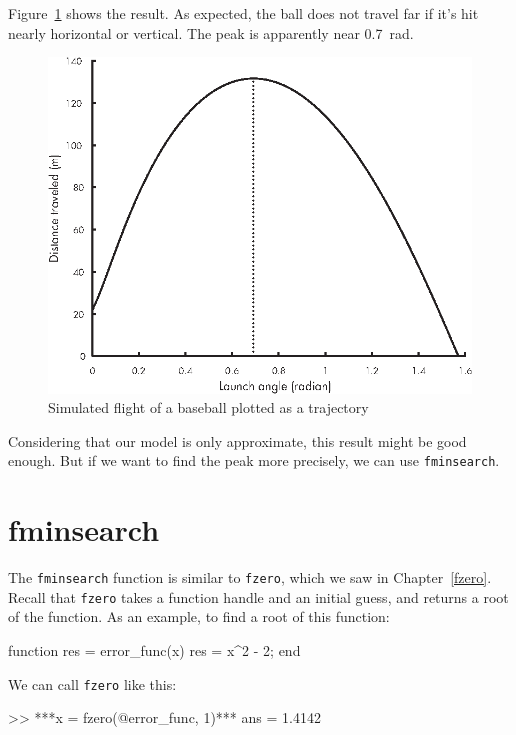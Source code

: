 Figure~\ref{fig:baseball4} shows the result.  As expected, the ball does not travel far if it's hit nearly horizontal or vertical. 
The peak is apparently near \SI{0.7}{\radian}.

\begin{figure}[H]
\includegraphics{book/images/figure13_02_new.eps}
\caption{Simulated flight of a baseball plotted as a trajectory}
\label{fig:baseball4}
\end{figure}


Considering that our model is only approximate, this result might be good enough.  But if we want to find the peak more precisely, we can use \lstinline{fminsearch}.


\section{fminsearch}

The \lstinline{fminsearch} function is similar to \lstinline{fzero}, which we saw in Chapter~\ref{fzero}.  Recall that \lstinline{fzero} takes a function handle and an initial guess, and returns a root of the function.
As an example, to find a root of this function:


\begin{code}
function res = error_func(x)
    res = x^2 - 2;
end
\end{code}
We can call \lstinline{fzero} like this:

\begin{code}
>> ***x = fzero(@error_func, 1)***
ans = 1.4142
\end{code}

